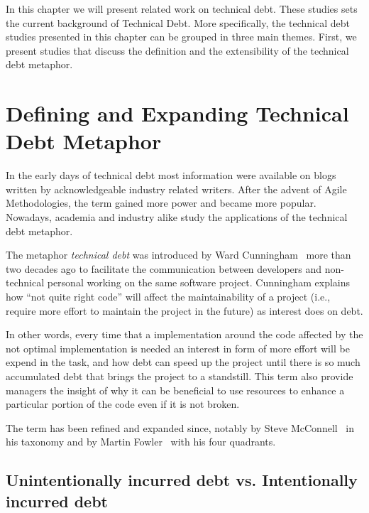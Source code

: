 
In this chapter we will present related work on technical debt. These studies sets the current background of Technical Debt. More specifically, the technical debt studies presented in this chapter can be grouped in three main themes. First, we present studies that discuss the definition and the extensibility of the technical debt metaphor. 

\section{Defining and Expanding Technical Debt Metaphor}
\label{defining_and_extending_technical_debt}

In the early days of technical debt most information were available on blogs written by acknowledgeable industry related writers. After the advent of Agile Methodologies, the term gained more power and became more popular. Nowadays, academia and industry alike study the applications of the technical debt metaphor.

The metaphor \textit{technical debt} was introduced by Ward Cunningham~\cite{Cunningham1992WPM} more than two decades ago to facilitate the communication between developers and non-technical personal working on the same software project. Cunningham explains how ``not quite right code'' will affect the maintainability of a project (i.e., require more effort to maintain the project in the future) as interest does on debt. 

In other words, every time that a implementation around the code affected by the not optimal implementation is needed an interest in form of more effort will be expend in the task, and how debt can speed up the project until there is so much accumulated debt that brings the project to a standstill. This term also provide managers the insight of why it can be beneficial to use resources to enhance a particular portion of the code even if it is not broken.

The term has been refined and expanded since, notably by Steve McConnell~\cite{McConnell07:TechnicalDebt} in his taxonomy and by Martin Fowler~\cite{MartinFowler:TechnicalDebtQuadrant} with his four quadrants. 

\subsection{Unintentionally incurred debt vs. Intentionally incurred debt}

